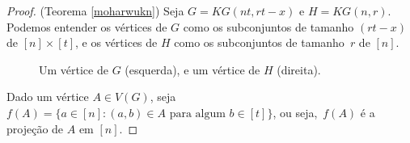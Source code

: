 \begin{proof}{(Teorema \ref{moharwukn})}
Seja $G = KG(nt, rt-x)$ e $H = KG(n,r)$. Podemos entender os vértices de $G$ como os subconjuntos de tamanho $(rt-x)$ de $[n]\times [t]$, e os vértices de $H$ como os subconjuntos de tamanho~$r$ de $[n]$. 


\begin{figure}[H]
\centering
{}
\caption{Um vértice de $G$ (esquerda), e um vértice de $H$ (direita).}
\label{fig:kneserknt}
\end{figure}

Dado um vértice $A\in V(G)$, seja $f(A) = \{a\in [n] : (a,b)\in A \text{ para algum }b\in [t]\}$, ou seja,~$f(A)$ é a projeção de $A$ em $[n]$.


\end{proof}
